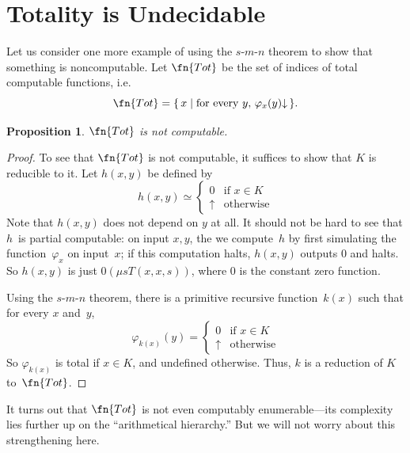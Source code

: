 \documentclass[10pt,a4paper]{article}
\theoremstyle{plain}
\newtheorem{prop}[thm]{Proposition}
\theoremstyle{definition}
\theoremstyle{remark}
\newenvironment{digress}{}{}
\newcommand*{\olfileid}[3]{}
\newcommand*{\olsection}[1]{\section*{#1}}
\newcommand*{\ollabel}[1]{\label{#1}}
\providecommand{\cfind}[1]{\varphi_{#1}}
\providecommand{\Zero}{\ensuremath{0}}
\providecommand{\fdefined}{\mathord{\downarrow}}
\providecommand{\Setabs}[2]{\{\, #1 \mid #2 \,\}}
\providecommand{\umin}{\mu}
\providecommand{\fundefined}{\mathord{\uparrow}}
\begin{document}



\olfileid{cmp}{thy}{tot}
\olsection{Totality is Undecidable}

Let us consider one more example of using the $s$-$m$-$n$ theorem to show
that something is noncomputable. Let $\fn{Tot}$ be the set of indices
of total computable functions, i.e.
\[
\fn{Tot} = \Setabs{x}{\text{for every $y$, $\cfind{x}(y)\fdefined$}}.
\]

\begin{prop}
\ollabel{prop:total}
$\fn{Tot}$ is not computable.
\end{prop}

\begin{proof}
To see that $\fn{Tot}$ is not computable, it suffices to show that $K$
is reducible to it. Let $h(x,y)$ be defined by
\[
h(x,y) \simeq
\begin{cases}
0 & \text{if $x \in K$} \\
\fundefined & \text{otherwise}
\end{cases}
\]
Note that $h(x,y)$ does not depend on $y$ at all. It should
not be hard to see that $h$~is partial computable: on input $x, y$, the
we compute~$h$ by first simulating the function~$\cfind{x}$ on input~$x$; if
this computation halts, $h(x,y)$ outputs $0$ and halts. So
$h(x,y)$ is just $\Zero(\umin{s}{T(x,x,s)})$, where $\Zero$ is the constant zero
function.

Using the $s$-$m$-$n$ theorem, there is a primitive recursive
function~$k(x)$ such that for every $x$ and~$y$,
\[
\cfind{k(x)}(y) =
\begin{cases}
0 & \text{if $x \in K$} \\
\fundefined & \text{otherwise}
\end{cases}
\]
So $\cfind{k(x)}$ is total if $x \in K$, and undefined otherwise. Thus,
$k$ is a reduction of $K$ to~$\fn{Tot}$.
\end{proof}

\begin{digress}
It turns out that $\fn{Tot}$ is not even computably enumerable---its
complexity lies further up on the ``arithmetical hierarchy.''  But we
will not worry about this strengthening here.
\end{digress}



\end{document}
